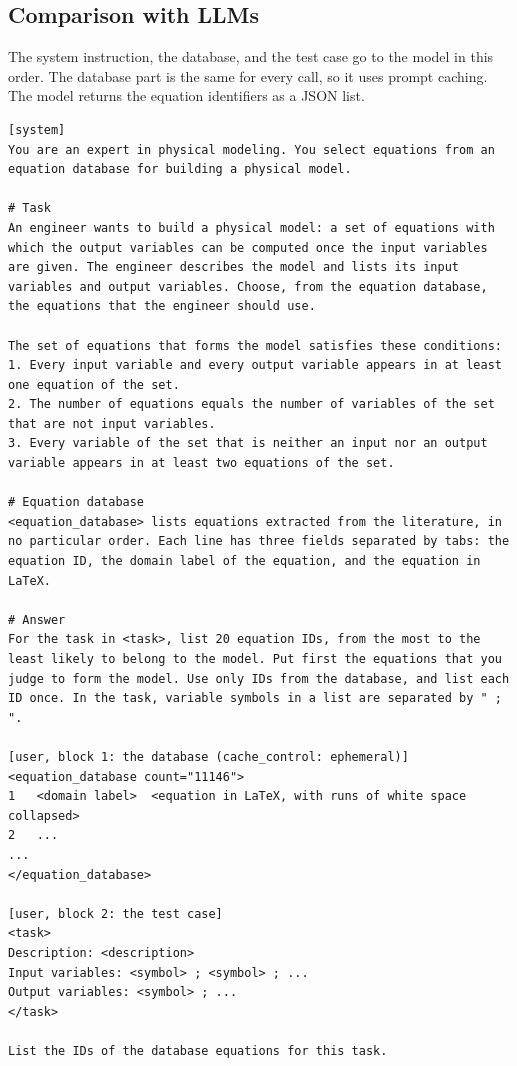 \subsection*{Comparison with LLMs}
The system instruction, the database, and the test case go to the model in this order. The
database part is the same for every call, so it uses prompt caching. The model returns the
equation identifiers as a JSON list.
\begin{Verbatim}[fontsize=\scriptsize, breaklines=true, frame=single]
[system]
You are an expert in physical modeling. You select equations from an equation database for building a physical model.

# Task
An engineer wants to build a physical model: a set of equations with which the output variables can be computed once the input variables are given. The engineer describes the model and lists its input variables and output variables. Choose, from the equation database, the equations that the engineer should use.

The set of equations that forms the model satisfies these conditions:
1. Every input variable and every output variable appears in at least one equation of the set.
2. The number of equations equals the number of variables of the set that are not input variables.
3. Every variable of the set that is neither an input nor an output variable appears in at least two equations of the set.

# Equation database
<equation_database> lists equations extracted from the literature, in no particular order. Each line has three fields separated by tabs: the equation ID, the domain label of the equation, and the equation in LaTeX.

# Answer
For the task in <task>, list 20 equation IDs, from the most to the least likely to belong to the model. Put first the equations that you judge to form the model. Use only IDs from the database, and list each ID once. In the task, variable symbols in a list are separated by " ; ".

[user, block 1: the database (cache_control: ephemeral)]
<equation_database count="11146">
1	<domain label>	<equation in LaTeX, with runs of white space collapsed>
2	...
...
</equation_database>

[user, block 2: the test case]
<task>
Description: <description>
Input variables: <symbol> ; <symbol> ; ...
Output variables: <symbol> ; ...
</task>

List the IDs of the database equations for this task.
\end{Verbatim}
